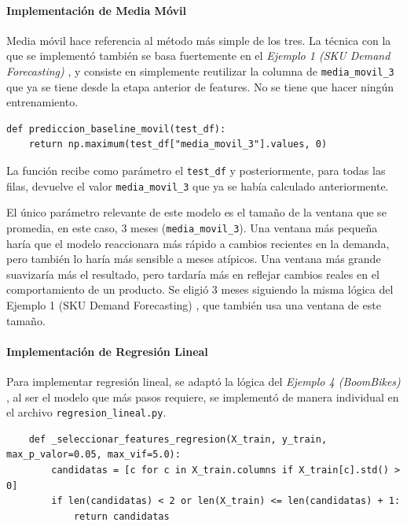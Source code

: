 \paragraph{Implementación de Media Móvil}

Media móvil hace referencia al método más simple de los tres. La técnica con la que se implementó también se basa fuertemente en el \textit{Ejemplo 1 (SKU Demand Forecasting)} \cite{ejemplo1_demandforecast}, y consiste en simplemente reutilizar la columna de \texttt{media\_movil\_3} que ya se tiene desde la etapa anterior de features. No se tiene que hacer ningún entrenamiento.

\label{lst:prediccion_media_movil}
\begin{verbatim}
def prediccion_baseline_movil(test_df):
    return np.maximum(test_df["media_movil_3"].values, 0)
\end{verbatim}

La función recibe como parámetro el \texttt{test\_df} y posteriormente, para todas las filas, devuelve el valor \texttt{media\_movil\_3} que ya se había calculado anteriormente.

El único parámetro relevante de este modelo es el tamaño de la ventana que se promedia, en este caso, 3 meses (\texttt{media\_movil\_3}). Una ventana más pequeña haría que el modelo reaccionara más rápido a cambios recientes en la demanda, pero también lo haría más sensible a meses atípicos. Una ventana más grande suavizaría más el resultado, pero tardaría más en reflejar cambios reales en el comportamiento de un producto. Se eligió 3 meses siguiendo la misma lógica del Ejemplo 1 (SKU Demand Forecasting) \cite{ejemplo1_demandforecast}, que también usa una ventana de este tamaño.

\paragraph{Implementación de Regresión Lineal}

Para implementar regresión lineal, se adaptó la lógica del \textit{Ejemplo 4 (BoomBikes)} \cite{ejemplo4_boombikes}, al ser el modelo que más pasos requiere, se implementó de manera individual en el archivo \texttt{regresion\_lineal.py}.

\label{lst:regresion_candidatas}
\begin{verbatim}
    def _seleccionar_features_regresion(X_train, y_train, max_p_valor=0.05, max_vif=5.0):
        candidatas = [c for c in X_train.columns if X_train[c].std() > 0]
        if len(candidatas) < 2 or len(X_train) <= len(candidatas) + 1:
            return candidatas
\end{verbatim}

